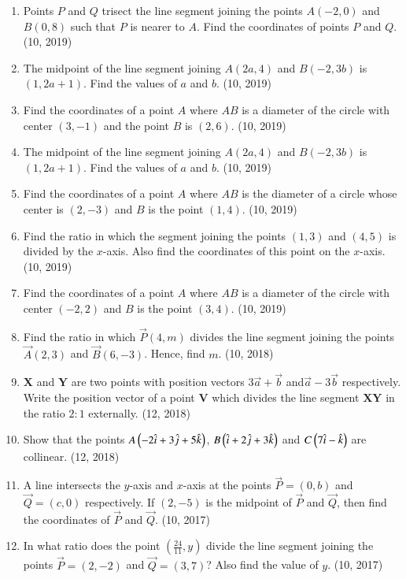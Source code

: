 \begin{enumerate}[label=\thesubsection.\arabic*,ref=\thesubsection.\theenumi]
\item Points $P$ and $Q$ trisect the line segment joining the points $A(-2, 0)$ and $B(0, 8)$ such that $P$ is nearer to $A$. Find the coordinates of points $P$ and $Q$. \hfill (10, 2019)
\item The midpoint of the line segment joining $A(2a, 4)$ and $B(-2, 3b)$ is $(1, 2a + 1)$. Find the values of $a$ and $b$. \hfill (10, 2019)
\item Find the coordinates of a point $A$ where $AB$ is a diameter of the circle with center $(3, -1)$ and the point $B$ is $(2, 6)$. \hfill (10, 2019)
\item The midpoint of the line segment joining $A(2a, 4)$ and $B(-2, 3b)$ is $(1, 2a + 1)$. Find the values of $a$ and $b$. \hfill (10, 2019)
\item Find the coordinates of a point $A$ where $AB$ is the diameter of a circle whose center is $(2, -3)$ and $B$ is the point $(1, 4)$. \hfill (10, 2019)
\item Find the ratio in which the segment joining the points $(1, 3)$ and $(4, 5)$ is divided by the $x$-axis. Also find the coordinates of this point on the $x$-axis. \hfill (10, 2019)
\item Find the coordinates of a point $A$ where $AB$ is a diameter of the circle with center $(-2, 2)$ and $B$ is the point $(3, 4)$. \hfill (10, 2019)
    \item Find the ratio in which $\vec{P}(4,m)$ divides the line segment joining the points $\vec{A}(2,3)$ and $\vec{B}(6,-3)$. Hence, find $m$. \hfill (10, 2018)
\item $\mathbf{X}$ and $\mathbf{Y}$ are two points with position vectors $3\overrightarrow{a}+\overrightarrow{b}$ and$\overrightarrow{a}-3\overrightarrow{b}$ respectively. Write the position vector of a point $\mathbf{V}$ which divides the line segment $\mathbf{XY}$ in the ratio $2:1$ externally.
\hfill (12, 2018) 
\item Show that the points $A\left(-2\hat{i} + 3\hat{j} + 5\hat{k}\right)$, $B\left(\hat{i} + 2\hat{j} + 3\hat{k}\right)$ and $C\left(7\hat{i} -\hat{k} \right)$ are collinear.
\hfill (12, 2018) 
\item A line intersects the $y$-axis and $x$-axis at the points $\vec{P} = (0, b)$ and $\vec{Q} = (c, 0)$ respectively. If $(2, -5)$ is the midpoint of $\vec{P}$ and $\vec{Q}$, then find the coordinates of $\vec{P}$ and $\vec{Q}$. \hfill (10, 2017)
\item In what ratio does the point $\left(\frac{24}{11}, y\right)$ divide the line segment joining the points $\vec{P} = (2, -2)$ and $\vec{Q} = (3, 7)$? Also find the value of $y$. \hfill (10, 2017)

\end{enumerate}
